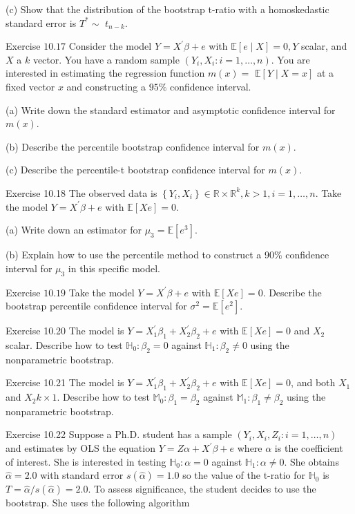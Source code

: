 \documentclass[10pt]{article}
\begin{document}
(c) Show that the distribution of the bootstrap t-ratio with a homoskedastic standard error is $T^{*} \sim$ $t_{n-k}$.

Exercise $10.17$ Consider the model $Y=X^{\prime} \beta+e$ with $\mathbb{E}[e \mid X]=0, Y$ scalar, and $X$ a $k$ vector. You have a random sample $\left(Y_{i}, X_{i}: i=1, \ldots, n\right)$. You are interested in estimating the regression function $m(x)=$ $\mathbb{E}[Y \mid X=x]$ at a fixed vector $x$ and constructing a $95 \%$ confidence interval.

(a) Write down the standard estimator and asymptotic confidence interval for $m(x)$.

(b) Describe the percentile bootstrap confidence interval for $m(x)$.

(c) Describe the percentile-t bootstrap confidence interval for $m(x)$.

Exercise 10.18 The observed data is $\left\{Y_{i}, X_{i}\right\} \in \mathbb{R} \times \mathbb{R}^{k}, k>1, i=1, \ldots, n$. Take the model $Y=X^{\prime} \beta+e$ with $\mathbb{E}[X e]=0 .$

(a) Write down an estimator for $\mu_{3}=\mathbb{E}\left[e^{3}\right]$.

(b) Explain how to use the percentile method to construct a 90\% confidence interval for $\mu_{3}$ in this specific model.

Exercise $10.19$ Take the model $Y=X^{\prime} \beta+e$ with $\mathbb{E}[X e]=0$. Describe the bootstrap percentile confidence interval for $\sigma^{2}=\mathbb{E}\left[e^{2}\right]$.

Exercise 10.20 The model is $Y=X_{1}^{\prime} \beta_{1}+X_{2}^{\prime} \beta_{2}+e$ with $\mathbb{E}[X e]=0$ and $X_{2}$ scalar. Describe how to test $\mathbb{H}_{0}: \beta_{2}=0$ against $\mathbb{H}_{1}: \beta_{2} \neq 0$ using the nonparametric bootstrap.

Exercise 10.21 The model is $Y=X_{1}^{\prime} \beta_{1}+X_{2}^{\prime} \beta_{2}+e$ with $\mathbb{E}[X e]=0$, and both $X_{1}$ and $X_{2} k \times 1$. Describe how to test $\mathbb{M}_{0}: \beta_{1}=\beta_{2}$ against $\mathbb{M}_{1}: \beta_{1} \neq \beta_{2}$ using the nonparametric bootstrap.

Exercise 10.22 Suppose a Ph.D. student has a sample $\left(Y_{i}, X_{i}, Z_{i}: i=1, \ldots, n\right)$ and estimates by OLS the equation $Y=Z \alpha+X^{\prime} \beta+e$ where $\alpha$ is the coefficient of interest. She is interested in testing $\mathbb{H}_{0}: \alpha=0$ against $\mathbb{H}_{1}: \alpha \neq 0$. She obtains $\widehat{\alpha}=2.0$ with standard error $s(\widehat{\alpha})=1.0$ so the value of the t-ratio for $\mathbb{H}_{0}$ is $T=\widehat{\alpha} / s(\widehat{\alpha})=2.0$. To assess significance, the student decides to use the bootstrap. She uses the following algorithm
\end{document}
